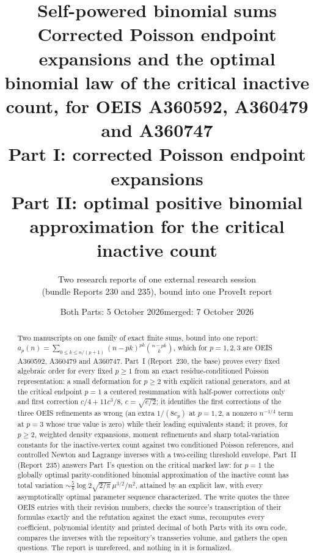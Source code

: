 \documentclass[11pt,letterpaper]{article}
\title{Self-powered binomial sums\\[4pt]\large Corrected Poisson endpoint expansions and the optimal binomial law of the critical inactive count, for OEIS A360592, A360479 and A360747\\[8pt]
\normalsize Part I: corrected Poisson endpoint expansions\\[2pt]
Part II: optimal positive binomial approximation for the critical inactive count}
\author{Two research reports of one external research session\\(bundle Reports 230 and 235), bound into one ProveIt report}
\date{Both Parts: 5 October 2026\quad merged: 7 October 2026}
\numberwithin{equation}{section}
\theoremstyle{definition}\newtheorem{definition}[theorem]{Definition}
\theoremstyle{remark}\newtheorem{remark}[theorem]{Remark}
\newcommand{\1}{\mathbf 1}
\begin{document}
\hypersetup{pageanchor=false}
\maketitle
\thispagestyle{empty}
\begin{abstract}
Two manuscripts on one family of exact finite sums, bound into one report:
$a_p(n)=\sum_{0\le k\le n/(p+1)}(n-pk)^{pk}\binom{n-pk}{k}$, which for
$p=1,2,3$ are OEIS A360592, A360479 and A360747. Part~I (Report~230, the base)
proves every fixed algebraic order for every fixed $p\ge1$ from an exact
residue-conditioned Poisson representation: a small deformation for $p\ge2$
with explicit rational generators, and at the critical endpoint $p=1$ a
centered resummation with half-power corrections only and first correction
$c/4+11c^3/8$, $c=\sqrt{e/2}$; it identifies the first corrections of the three
OEIS refinements as wrong (an extra $1/(8c_p)$ at $p=1,2$, a nonzero
$n^{-1/4}$ term at $p=3$ whose true value is zero) while their leading
equivalents stand; it proves, for $p\ge2$, weighted density expansions, moment
refinements and sharp total-variation constants for the inactive-vertex count
against two conditioned Poisson references, and controlled Newton and Lagrange
inverses with a two-ceiling threshold envelope. Part~II (Report~235) answers
Part~I's question on the critical marked law: for $p=1$ the globally optimal
parity-conditioned binomial approximation of the inactive count has total
variation $\sim\frac58\log2\sqrt{2/\pi}\,\mu^{3/2}/n^2$, attained by an
explicit law, with every asymptotically optimal parameter sequence
characterized. The write quotes the three OEIS entries with their revision
numbers, checks the source's transcription of their formulas exactly and the
refutation against the exact sums, recomputes every coefficient, polynomial
identity and printed decimal of both Parts with its own code, compares the
inverses with the repository's transseries volume, and gathers the open
questions. The report is unrefereed, and nothing in it is formalized.
\end{abstract}
\end{document}
